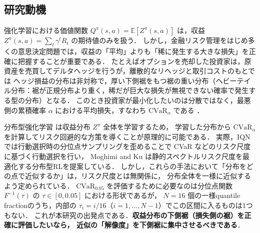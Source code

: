 \documentclass[a4paper,10pt]{jsarticle}
\theoremstyle{definition}
\newcommand{\CVaR}{\mathrm{CVaR}}
\newcommand{\Finv}{F^{-1}}
\newcommand{\E}{\mathbb{E}}
\begin{document}
\subsection{研究動機}
強化学習における価値関数 $Q^\pi(s,a)=\E[Z^\pi(s,a)]$ は，収益 $Z^\pi(s,a)=\sum_t\gamma^t R_t$ の期待値のみを扱う．
しかし，金融リスク管理をはじめ多くの意思決定問題では，収益の「平均」よりも「稀に発生する大きな損失」を正確に把握することが重要である．
たとえばオプションを売却した投資家は，原資産を売買してデルタヘッジを行うが，離散的なリヘッジと取引コストのもとでは
ヘッジ損益の分布は非対称で，厚い下側裾をもつ裾の重い分布（ヘビーテイル分布：裾が正規分布より重く，稀だが巨大な損失が無視できない確率で発生する型の分布）となる．
このとき投資家が最小化したいのは分散ではなく，最悪側の累積確率 $\alpha$ における平均損失，すなわち $\CVaR_\alpha$ である \cite{rockafellar2000cvar}．

分布型強化学習 \cite{bellemare2017c51,dabney2018qrdqn,dabney2018iqn,yang2019fqf} は収益分布 $Z^\pi$ 全体を学習するため，
学習した分布から $\CVaR_\alpha$ を計算してリスク回避的な方策を導くことが原理的に可能である．
実際，IQN \cite{dabney2018iqn} では行動選択時の分位点サンプリングを歪めることで CVaR などのリスク尺度に基づく行動選択を行い，
Moghimi and Ku \cite{moghimi2025beyond} は静的スペクトルリスク尺度を最適化する分布型RLを提案している．
しかし，これらの手法において「分布をどの点で近似するか」は，リスク尺度とは無関係に，
分布全体を一様に近似するよう定められている．
$\CVaR_{0.05}$ を評価するために必要なのは分位点関数 $\Finv(\tau)$ の $\tau\in[0,0.05]$ における形状であるが，
$N=16$ 個の一様quantile fractionのうち，内部の $\tau_i=i/16$（$i=1,\dots,N-1$）でこの区間に入るものは1つもない．
これが本研究の出発点である．\textbf{収益分布の下側裾（損失側の裾）を正確に評価したいなら，
近似の「解像度」を下側裾に集中させるべきである}．
\end{document}
